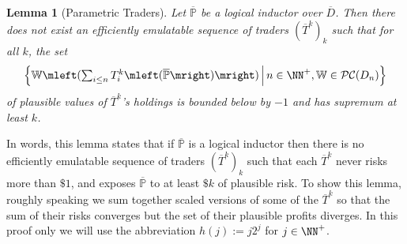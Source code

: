 \documentclass[authordate,onecolumn,noenvironments]{miri-tech-article}
\numberwithin{equation}{subsection}
\newtheorem{lemma}[theorem]{Lemma}
\newcommand{\seq}[1]{{\overline{#1}}}
\newcommand{\nn}{n}
\newcommand{\li}{logical inductor}
\newcommand{\trade}{T}%
\newcommand{\Trader}{\seq{\trade}} %
\newcommand{\BelState}{\mathbb{P}}
\newcommand{\pt}{\BelState}
\newcommand{\MP}{\seq{\pt}}
\newcommand{\dt}{D}
\newcommand{\DP}{\seq{\dt}}
\newcommand{\pcworlds}{\mathcal{P\-C}}
\newcommand{\World}{\mathbb{W}}
\newcommand{\itwoi}[1]{h(#1)}
\begin{document}
\begin{lemma}[Parametric Traders]\label{lem:type2}
  Let $\MP$ be a logical inductor over $\DP$. Then there does not exist an efficiently emulatable sequence of traders $(\Trader^k)_k$ such that for all $k$, the set
%
  \[
    \left\{ \World\mleft({\textstyle \sum_{i \leq n} \trade^k_i\mleft(\MP\mright)}\mright) \,\middle|\, \nn \in \NN^+, \World \in
    \pcworlds(\dt_{\nn}) \right\}
  \]
of plausible values of $\Trader^k$'s holdings is bounded below by $-1$ and has supremum at least $k$. 
\end{lemma}
%
In words, this lemma states that if $\MP$ is a \li{} then there is no 
efficiently emulatable sequence of traders $(\Trader^k)_k$ such that each $\Trader^k$ never risks more than $\$ 1$, and exposes $\MP$ to at least $\$ k$ of
plausible risk. To show this lemma, roughly speaking we sum together scaled versions of some of the $\Trader^k$ so that the sum of their risks converges but
the set of their plausible profits diverges.  In this proof only  we will use the abbreviation $\itwoi{j} := j2^j$ for $j \in \NN^+$.  
\end{document}
